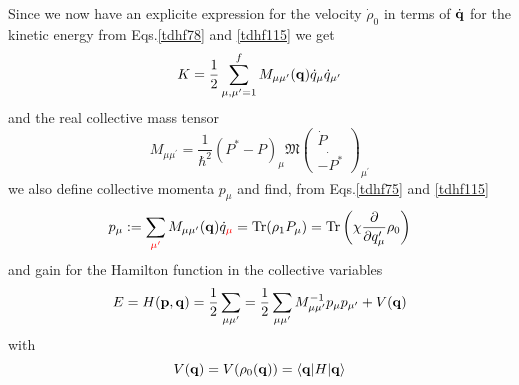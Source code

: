  Since we now have an explicite expression for the velocity $\dot{\rho}_0$ in terms of $\dot{\bf{q}}$ for the kinetic energy from Eqs.\eqref{tdhf78} and \eqref{tdhf115} we get 
  \begin{equation}
    K = \frac{1}{2}\sum_{\mu,\mu^\prime = 1}^{f}M_{\mu\mu^\prime}({\bf{q}}) \dot{q}_\mu \dot{q}_{\mu^\prime}	 \label{tdhf117}
  \end{equation}
  and the real collective mass tensor
  \begin{equation}
    M_{\mu\mu^{\prime}} = \frac{1}{\hbar^2}(P^* -P)_\mu  \mathfrak{M}	 \label{tdhf118}
      \left(
        \begin{array}{c}
          \dot{P}\\
          \dot{-P^*}
        \end{array}
      \right)_{\mu^\prime} 
  \end{equation}
  we also define collective momenta $p_\mu$ and find, from Eqs.\eqref{tdhf75} and \eqref{tdhf115}
  \begin{equation}
    p_\mu := \sum_{\textcolor{red}{\mu^\prime}} M_{\mu\mu^{\prime}}({\bf{q}})\dot{q}_{\textcolor{red}{\mu}} = {\rm Tr}(\rho_1P_\mu) = {\rm Tr}\left(\chi \frac{\partial}{\partial q_\mu\rq}\rho_0\right)	 \label{tdhf119}
  \end{equation}
  and gain for the Hamilton function in the collective variables
  \begin{equation}
    E = H({\bf{p}}, {\bf{q}}) = \frac{1}{2}\sum_{\mu\mu\rq} = \frac{1}{2} \sum_{\mu\mu\rq}M^{-1}_{\mu\mu\rq}p_\mu p_{\mu\rq} + V({\bf{q}})	 \label{tdhf120}
  \end{equation}
  with 
  \begin{equation}
    V({\bf{q}}) = V(\rho_0({\bf{q}})) = \langle {\bf{q}} | H | {\bf{q}} \rangle	 \label{tdhf121}
  \end{equation}

